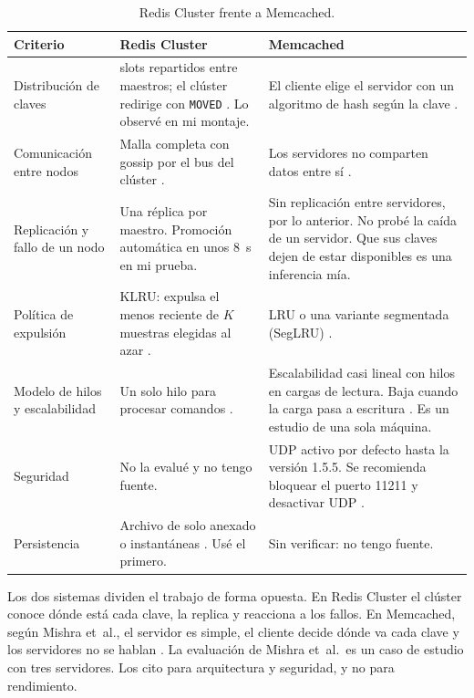 \documentclass[11pt,a4paper]{article}
\begin{document}
\begin{table}[htbp]
\centering
\caption{Redis Cluster frente a Memcached.}
\label{tab:comparacion}
\small
\begin{tabularx}{\linewidth}{>{\raggedright\arraybackslash}p{2.6cm}>{\raggedright\arraybackslash}X>{\raggedright\arraybackslash}X}
\toprule
Criterio & Redis Cluster & Memcached \\
\midrule
Distribución de claves & 16384 slots repartidos entre maestros; el clúster redirige con \texttt{MOVED} \cite{redis2026clusterspec}. Lo observé en mi montaje. & El cliente elige el servidor con un algoritmo de hash según la clave \cite[p.~7]{mishra2021memcached}. \\
Comunicación entre nodos & Malla completa con gossip por el bus del clúster \cite{redis2026clusterspec}. & Los servidores no comparten datos entre sí \cite[p.~7]{mishra2021memcached}. \\
Replicación y fallo de un nodo & Una réplica por maestro. Promoción automática en unos 8~s en mi prueba. & Sin replicación entre servidores, por lo anterior. No probé la caída de un servidor. Que sus claves dejen de estar disponibles es una inferencia mía. \\
Política de expulsión & KLRU: expulsa el menos reciente de $K$ muestras elegidas al azar \cite[p.~1]{yang2023memcached}. & LRU o una variante segmentada (SegLRU) \cite[p.~1]{yang2023memcached}. \\
Modelo de hilos y escalabilidad & Un solo hilo para procesar comandos \cite{bodra2025comparative}. & Escalabilidad casi lineal con hilos en cargas de lectura. Baja cuando la carga pasa a escritura \cite{yang2023memcached}. Es un estudio de una sola máquina. \\
Seguridad & No la evalué y no tengo fuente. & UDP activo por defecto hasta la versión 1.5.5. Se recomienda bloquear el puerto 11211 y desactivar UDP \cite{mishra2021memcached}. \\
Persistencia & Archivo de solo anexado o instantáneas \cite{bodra2025comparative}. Usé el primero. & Sin verificar: no tengo fuente. \\
\bottomrule
\end{tabularx}
\end{table}

Los dos sistemas dividen el trabajo de forma opuesta. En Redis Cluster el clúster conoce dónde está cada clave, la replica y reacciona a los fallos. En Memcached, según Mishra et~al., el servidor es simple, el cliente decide dónde va cada clave y los servidores no se hablan \cite{mishra2021memcached}. La evaluación de Mishra et~al.\ es un caso de estudio con tres servidores. Los cito para arquitectura y seguridad, y no para rendimiento.
\end{document}
